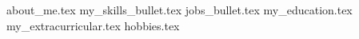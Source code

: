 \documentclass[10pt, a4paper]{awesome-cv2}
\newcommand*{\sectiondir}{cv/}
\begin{document}
\makecvheader[R]

{about_me.tex}
{my_skills_bullet.tex}
{jobs_bullet.tex}
{my_education.tex}
{my_extracurricular.tex}
{hobbies.tex}
\end{document}
